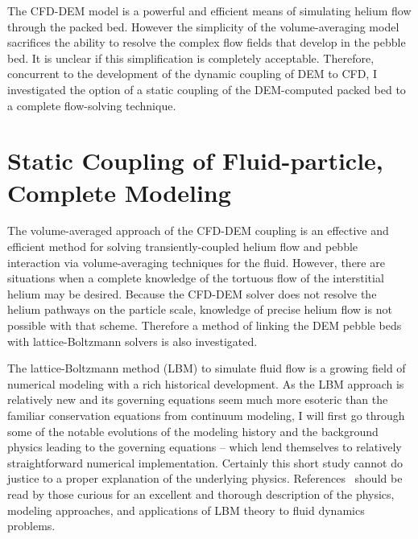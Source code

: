 The CFD-DEM model is a powerful and efficient means of simulating helium flow through the packed bed. However the simplicity of the volume-averaging model sacrifices the ability to resolve the complex flow fields that develop in the pebble bed. It is unclear if this simplification is completely acceptable. Therefore, concurrent to the development of the dynamic coupling of DEM to CFD, I investigated the option of a static coupling of the DEM-computed packed bed to a complete flow-solving technique.







%
%
\section{Static Coupling of Fluid-particle, Complete Modeling}\label{sec:modeling-lbm}
The volume-averaged approach of the CFD-DEM coupling is an effective and efficient method for solving transiently-coupled helium flow and pebble interaction via volume-averaging techniques for the fluid. However, there are situations when a complete knowledge of the tortuous flow of the interstitial helium may be desired. Because the CFD-DEM solver does not resolve the helium pathways on the particle scale, knowledge of precise helium flow is not possible with that scheme. Therefore a method of linking the DEM pebble beds with lattice-Boltzmann solvers is also investigated.

The lattice-Boltzmann method (LBM) to simulate fluid flow is a growing field of numerical modeling with a rich historical development. As the LBM approach is relatively new and its governing equations seem much more esoteric than the familiar conservation equations from continuum modeling, I will first go through some of the notable evolutions of the modeling history and the background physics leading to the governing equations -- which lend themselves to relatively straightforward numerical implementation. Certainly this short study cannot do justice to a proper explanation of the underlying physics. References~\cite{Chen1998a,Viggen2009,Sukop2007,Chopard2002,succi2001lattice} should be read by those curious for an excellent and thorough description of the physics, modeling approaches, and applications of LBM theory to fluid dynamics problems.




